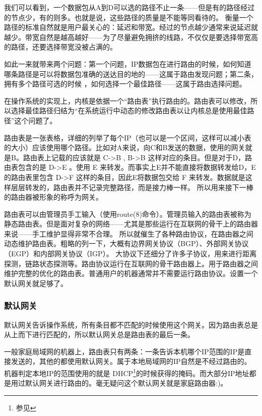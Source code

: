 我们可以看到，一个数据包从A到D可以选的路径不止一条——但是有的路径经过的节点少，有的则多。也就是说，这些路径的质量是不能等同看待的。
衡量一个路径的标准自然就是用户最关心的：延迟和带宽。经过的节点越少通常来说延迟就越少。带宽自然是越高越好——为了尽量避免拥挤的线路，不仅仅是要选择带宽高的路径，还要选择带宽没被占满的。

如此一来就带来两个问题：第一个问题，IP数据包在进行路由的时候，如何知道哪条路径是可以将数据包准确的送达目的地的——这属于路由发现问题；第二条，拥有多个路径可选的时候 ，如何选择一个最佳路径——这属于路由选择问题。

在操作系统的实现上，内核是依据一个“路由表”执行路由的。路由表可以修改，所以选择最佳路径归结为“在系统运行中动态的修改路由表以让内核总是使用最佳路径”这个问题了。

路由表是一张表格，详细的列举了每个IP（也可以是一个区间，这样可以减小表的大小）应该使用哪个路径。比如对A来说，向C和B发送的数据，使用的网关就是B。路由表上记载的应该就是 C->B , B->B 这样对应的条目。但是对于D，路由表包含的是 D->E 。使用 E 来转发。而事实上E并不能直接将数据转发给D，E 的路由表里包含 D->F 这样的条目，因此E将数据包交给 F 来转发。数据就是这样层层转发的，路由表并不记录完整路径，而是接力棒一样。
所以用来接下一棒的路由器被形象的称呼为网关。

路由表可以由管理员手工输入（使用route(8)命令）。管理员输入的路由表被称为静态路由表。但是面对复杂的网络——尤其是那些运行在互联网的骨干上的路由器来说——手工维护显得非常不合理。
所以就催生了各种路由协议，在路由器之间动态维护路由表。粗略的列一下，大概有边界网关协议（BGP）、外部网关协议（EGP）和内部网关协议（IGP）。
大协议下还细分了许多子协议，用来进行距离探测，链路状态探测等。路由协议运行在互联网的骨干路由器上。用于路由器之间维护完整的优化的路由表。普通用户的机器通常并不需要运行路由协议。设置一个默认网关就足够了。

\begin{insertnote}
\subsubsection*{默认网关}

默认网关告诉操作系统，所有条目都不匹配的时候使用这个网关。因为路由表总是从上而下进行匹配的，所以默认网关总是路由表的最后一条。

一般家庭局域网的机器上，路由表只有两条：一条告诉本机哪个IP范围的IP是直接发送的，其他的都使用默认网关。属于本地局域网的IP自然是不经过路由的。机器判定本地IP的范围使用的就是
DHCP\footnote{参见}的时候获得的掩码。而大部分IP地址都是用过默认网关进行路由的。毫无疑问这个默认网关就是家庭路由器:)。

\end{insertnote}

